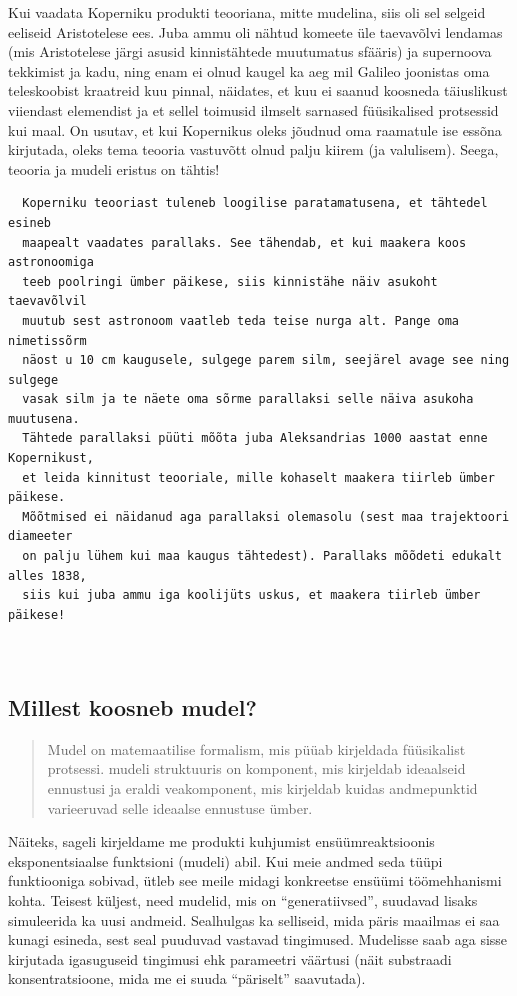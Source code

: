 \documentclass[]{book}
\begin{document}
Kui vaadata Koperniku produkti teooriana, mitte mudelina, siis oli sel
selgeid eeliseid Aristotelese ees. Juba ammu oli nähtud komeete üle
taevavõlvi lendamas (mis Aristotelese järgi asusid kinnistähtede
muutumatus sfääris) ja supernoova tekkimist ja kadu, ning enam ei olnud
kaugel ka aeg mil Galileo joonistas oma teleskoobist kraatreid kuu
pinnal, näidates, et kuu ei saanud koosneda täiuslikust viiendast
elemendist ja et sellel toimusid ilmselt sarnased füüsikalised
protsessid kui maal. On usutav, et kui Kopernikus oleks jõudnud oma
raamatule ise essõna kirjutada, oleks tema teooria vastuvõtt olnud palju
kiirem (ja valulisem). Seega, teooria ja mudeli eristus on tähtis!

\begin{verbatim}
  Koperniku teooriast tuleneb loogilise paratamatusena, et tähtedel esineb
  maapealt vaadates parallaks. See tähendab, et kui maakera koos astronoomiga
  teeb poolringi ümber päikese, siis kinnistähe näiv asukoht taevavõlvil
  muutub sest astronoom vaatleb teda teise nurga alt. Pange oma nimetissõrm
  näost u 10 cm kaugusele, sulgege parem silm, seejärel avage see ning sulgege
  vasak silm ja te näete oma sõrme parallaksi selle näiva asukoha muutusena.
  Tähtede parallaksi püüti mõõta juba Aleksandrias 1000 aastat enne Kopernikust, 
  et leida kinnitust teooriale, mille kohaselt maakera tiirleb ümber päikese. 
  Mõõtmised ei näidanud aga parallaksi olemasolu (sest maa trajektoori diameeter 
  on palju lühem kui maa kaugus tähtedest). Parallaks mõõdeti edukalt alles 1838, 
  siis kui juba ammu iga koolijüts uskus, et maakera tiirleb ümber päikese!
  
  
\end{verbatim}

\subsection{Millest koosneb mudel?}\label{millest-koosneb-mudel}

\begin{quote}
Mudel on matemaatilise formalism, mis püüab kirjeldada füüsikalist
protsessi. mudeli struktuuris on komponent, mis kirjeldab ideaalseid
ennustusi ja eraldi veakomponent, mis kirjeldab kuidas andmepunktid
varieeruvad selle ideaalse ennustuse ümber.
\end{quote}

Näiteks, sageli kirjeldame me produkti kuhjumist ensüümreaktsioonis
eksponentsiaalse funktsioni (mudeli) abil. Kui meie andmed seda tüüpi
funktiooniga sobivad, ütleb see meile midagi konkreetse ensüümi
töömehhanismi kohta. Teisest küljest, need mudelid, mis on
``generatiivsed'', suudavad lisaks simuleerida ka uusi andmeid.
Sealhulgas ka selliseid, mida päris maailmas ei saa kunagi esineda, sest
seal puuduvad vastavad tingimused. Mudelisse saab aga sisse kirjutada
igasuguseid tingimusi ehk parameetri väärtusi (näit substraadi
konsentratsioone, mida me ei suuda ``päriselt'' saavutada).
\end{document}
